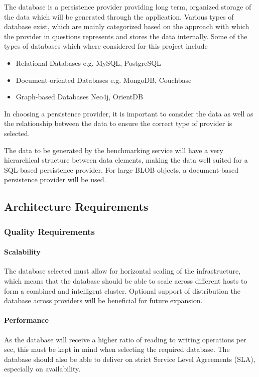The database is a persistence provider providing long term, organized storage
of the data which will be generated through the application. Various types of
database exist, which are mainly categorized based on the approach with which
the provider in questions represents and stores the data internally. Some of 
the types of databases which where considered for this project include
\begin{itemize}
	\item Relational Databases e.g. MySQL, PostgreSQL
	\item Document-oriented Databases e.g. MongoDB, Couchbase
	\item Graph-based Databases Neo4j, OrientDB
\end{itemize}

In choosing a persistence provider, it is important to consider the data as
well as the relationship between the data to ensure the correct type of 
provider is selected.

The data to be generated by the benchmarking service will have a very hierarchical
structure between data elements, making the data well suited for a SQL-based
persistence provider. For large BLOB objects, a document-based persistence
provider will be used.

\subsection{Architecture Requirements}
\subsubsection{Quality Requirements}
\paragraph*{Scalability}
The database selected must allow for horizontal scaling of the infrastructure,
which means that the database should be able to scale across different hosts to
form a combined and intelligent cluster. Optional support of distribution the
database across providers will be beneficial for future expansion.

\paragraph*{Performance}
As the database will receive a higher ratio of reading to writing operations
per sec, this must be kept in mind when selecting the required database. The
database should also be able to deliver on strict Service Level Agreements
(SLA), especially on availability.

